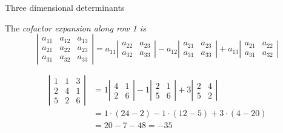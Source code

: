 \documentclass{beamer}
\begin{document}
\begin{frame}{Three dimensional determinants}
  \begin{definition}
    The \emph{cofactor expansion along row 1 is}
    \begin{equation*}
      \left|
	\begin{array}{ccc}
          a_{11}&a_{12}&a_{13}\\
          a_{21}&a_{22}&a_{23}\\
          a_{31}&a_{32}&a_{33}
	\end{array}
      \right| = a_{11} \left|
	\begin{array}{cc}
          a_{22}&a_{23}\\
          a_{32}&a_{33}
	\end{array}
      \right|-a_{12} \left|
	\begin{array}{cc}
          a_{21}&a_{23}\\
          a_{31}&a_{33}
	\end{array}
      \right|+a_{13} \left|
	\begin{array}{cc}
          a_{21}&a_{22}\\
          a_{31}&a_{32}
	\end{array}
      \right|
    \end{equation*}
  \end{definition}
  \begin{example}
    \begin{align*}
      \left|
	\begin{array}{ccc}
          1&1&3\\
          2&4&1\\
          5&2&6
	\end{array}
      \right| &= 1 \left|
	\begin{array}{cc}
          4&1\\
          2&6
	\end{array}
      \right| -1 \left|
	\begin{array}{cc}
          2&1\\
          5&6
	\end{array}
      \right|+3 \left|
	\begin{array}{cc}
          2&4\\
          5&2
	\end{array}
             \right|\\
           &= 1\cdot(24-2)-1\cdot(12-5)+3\cdot(4-20) \\
      &= 20-7-48 = -35
    \end{align*}
  \end{example}
\end{frame}
\end{document}
